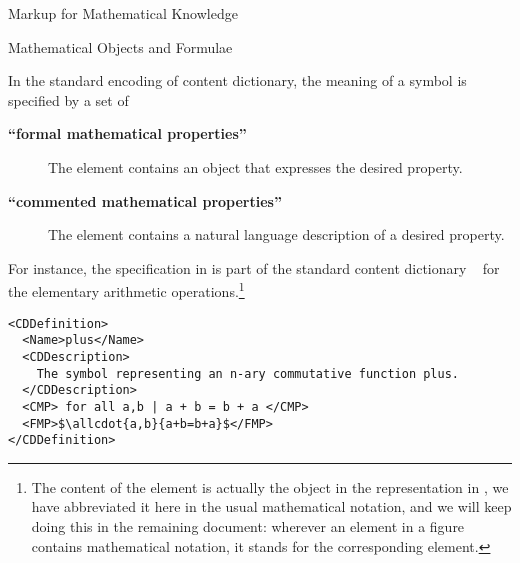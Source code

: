 \begin{tchapter}[id=math-markup]{Markup for Mathematical Knowledge}
\begin{tsection}[id=math-objects]{Mathematical Objects and Formulae}
\begin{tsubsection}[id=math-markup:openmath]{\openmath}
  In the standard encoding of {\openmath} content dictionary, the meaning of a symbol is
  specified by a set of
  \begin{description}
  \item[{\bf{``formal mathematical properties''}}]
    The {} element contains an {\openmath} object that expresses
    the desired property.
  \item[{\bf{``commented mathematical
        properties''}}] The
    {} element contains a natural language description of a
    desired property.
  \end{description}
  For instance, the specification in {} is part of the standard
  {\openmath} content dictionary {}~\cite{URL:omcd-core} for the
  elementary arithmetic operations.\footnote{The content of the
    {} element is actually the {\openmath} object in the
    representation in {}, we have abbreviated it here in the usual
    mathematical notation, and we will keep doing this in the remaining document: wherever
    an {\xml} element in a figure contains mathematical notation, it stands for the
    corresponding {\openmath} element.}
\begin{lstlisting}[label=lst:arith1,language=omCD,mathescape,
  caption={Part of the {\sc OpenMath} Content Dictionary {\snippet{arith1}}.},
  index={CDDefinition,Name,dc:description,CMP,FMP}]
<CDDefinition>
  <Name>plus</Name> 
  <CDDescription>
    The symbol representing an n-ary commutative function plus.
  </CDDescription> 
  <CMP> for all a,b | a + b = b + a </CMP>
  <FMP>$\allcdot{a,b}{a+b=b+a}$</FMP> 
</CDDefinition>
\end{lstlisting}


\end{tsubsection}
\end{tsection}
\end{tchapter}
